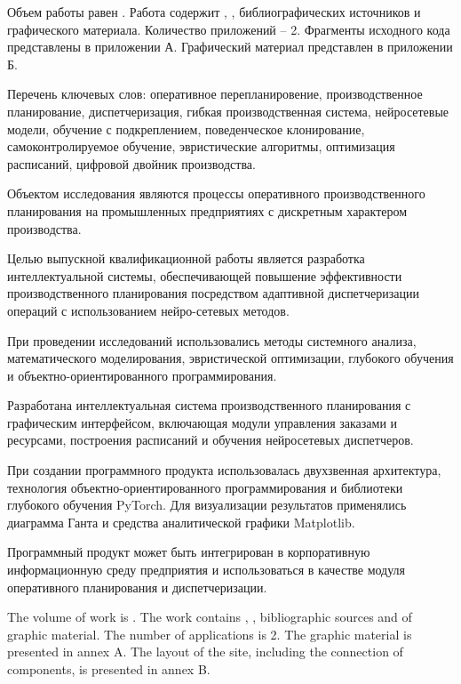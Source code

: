 
Объем работы равен . Работа содержит , ,  библиографических источников и  графического материала. Количество приложений – 2. Фрагменты исходного кода представлены в приложении А. Графический материал представлен в приложении Б.

Перечень ключевых слов: оперативное перепланировение, производственное планирование, диспетчеризация, гибкая производственная система, нейросетевые модели, обучение с подкреплением, поведенческое клонирование, самоконтролируемое обучение, эвристические алгоритмы, оптимизация расписаний, цифровой двойник производства.

Объектом исследования являются процессы оперативного производственного планирования на промышленных предприятиях с дискретным характером производства.

Целью выпускной квалификационной работы является разработка интеллектуальной системы, обеспечивающей повышение эффективности производственного планирования посредством адаптивной диспетчеризации операций с использованием нейро-сетевых методов.

При проведении исследований использовались методы системного анализа, математического моделирования, эвристической оптимизации, глубокого обучения и объектно-ориентированного программирования.

Разработана интеллектуальная система производственного планирования с графическим интерфейсом, включающая модули управления заказами и ресурсами, построения расписаний и обучения нейросетевых диспетчеров.

При создании программного продукта использовалась двухзвенная архитектура, технология объектно-ориентированного программирования и библиотеки глубокого обучения PyTorch. Для визуализации результатов применялись диаграмма Ганта и средства аналитической графики Matplotlib.

Программный продукт может быть интегрирован в корпоративную информационную среду предприятия и использоваться в качестве модуля оперативного планирования и диспетчеризации.

  
The volume of work is . The work contains , ,  bibliographic sources and  of graphic material. The number of applications is 2. The graphic material is presented in annex A. The layout of the site, including the connection of components, is presented in annex B.

